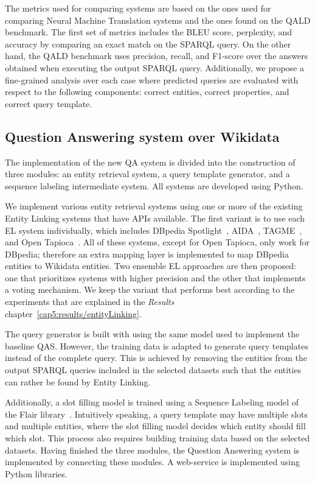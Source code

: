 The metrics used for comparing systems are based on the ones used for comparing Neural 
Machine Translation systems and the ones found on the QALD benchmark. The first set of 
metrics includes the BLEU score, perplexity, and accuracy by comparing an exact match on 
the SPARQL query. On the other hand, the QALD benchmark uses precision, recall, and F1-score 
over the answers obtained when executing the output SPARQL query. Additionally, 
we propose a fine-grained analysis over each case where predicted queries are evaluated with 
respect to the following components: correct entities, correct properties, and correct query 
template.

\subsection*{Question Answering system over Wikidata}
The implementation of the new QA system is divided into the construction of three modules: 
an entity retrieval system, a query template generator, and a sequence labeling intermediate 
system. All systems are developed using Python.

We implement various entity retrieval systems using one or more of the existing Entity 
Linking systems that have APIs available. The first variant is to use each EL system individually, 
which includes DBpedia Spotlight~\cite{EL:dbpedia-spotlight-MendesJGB11}, AIDA~\cite{EL:aida-tool-YosefHBSW11}, 
TAGME~\cite{EL:tagme-FerraginaS10}, and Open Tapioca~\cite{EL:opentapioca-Delpeuch19}. 
All of these systems, except for Open Tapioca, only work for DBpedia; therefore an 
extra mapping layer is implemented to map DBpedia entities to Wikidata entities. Two ensemble 
EL approaches are then proposed: one that prioritizes systems with higher precision 
and the other that implements a voting mechanism. We keep the variant that performs best 
according to the experiments that are explained in the \textit{Results} chapter~\ref{cap5:results/entityLinking}.

The query generator is built with using the same model used to implement the baseline QAS. 
However, the training data is adapted to generate query templates instead of the complete 
query. This is achieved by removing the entities from the output SPARQL queries included 
in the selected datasets such that the entities can rather be found by Entity Linking.

Additionally, a slot filling model is trained using a Sequence Labeling model of the Flair 
library~\cite{seqlab:flair-AkbikBBRSV19}. Intuitively speaking, a query template may have 
multiple slots and multiple entities, where the slot filling model decides which entity should fill which slot.
This process also requires building training data based on the selected datasets. 
Having finished the three modules, the Question Answering system is implemented by 
connecting these modules. A web-service is implemented using Python libraries.


